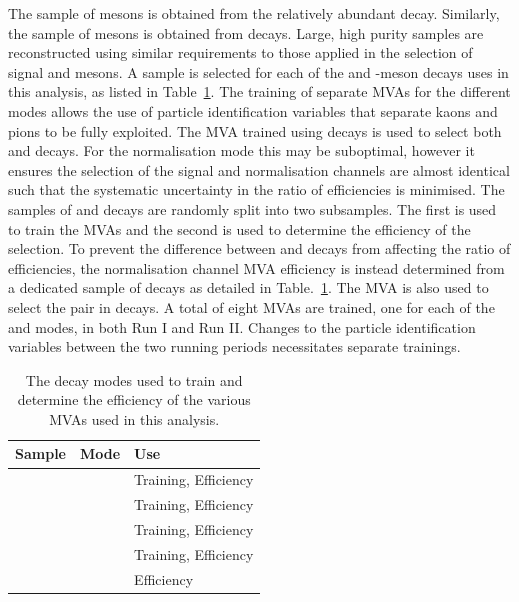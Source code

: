 The sample of \Dsp mesons is obtained from the relatively abundant \decay{\Bsb}{\Dsp\pim} decay. Similarly, the sample of \phiz mesons is obtained from \decay{\Bs}{\jpsi\phiz} decays. Large, high purity samples are reconstructed using similar requirements to those applied in the selection of signal \Dsp and \phiz mesons.
A sample is selected for each of the \Dsp and \phiz-meson decays uses in this analysis, as listed in Table~\ref{tab:mva_modes}. 
The training of separate MVAs for the different \Dsp modes allows the use of particle identification variables that separate kaons and pions to be fully exploited.
The MVA trained using \decay{\Bs}{\jpsi(\decay{\phiz}{\Kp\Km})} decays is used to select both \decay{\phiz}{\Kp}{\Km} and \decay{\Dzb}{\Kp\Km} decays. For the normalisation mode this may be suboptimal, however it ensures the selection of the signal and normalisation channels are almost identical such that the systematic uncertainty in the ratio of efficiencies is minimised.
The samples of \decay{\Bsb}{\Dsp\pim} and \decay{\Bs}{\jpsi\phiz} decays are randomly split into two subsamples. The first is used to train the MVAs and the second is used to determine the efficiency of the selection. To prevent the difference between \phiz and \Dzb decays from affecting the ratio of efficiencies, the normalisation channel MVA efficiency is instead determined from a dedicated sample of \decay{\Dzb}{\Kp\Km} decays as detailed in Table.~\ref{tab:mva_modes}. The \decay{\phiz}{\Kp\Km} MVA is also used to select the \Kp\Km pair in \decay{\Bp}{\Dsp\Kp\Km} decays.
A total of eight MVAs are trained, one for each of the \Dsp and \phiz modes, in both Run I and Run II. Changes to the particle identification variables between the two running periods necessitates separate trainings. 


\begin{table}[h]
\centering
\begin{tabular}{lll}
   \hline
   Sample                    & Mode                       & Use \\ 
   \hline
   \decay{\Bsb}{\Dsp\pim}    & \decay{\Dsp}{\Kp\Km\pip}   & Training, Efficiency \\
   \decay{\Bsb}{\Dsp\pim}    & \decay{\Dsp}{\Kp\pim\pip}  & Training, Efficiency \\
   \decay{\Bsb}{\Dsp\pim}    & \decay{\Dsp}{\pip\pim\pip} & Training, Efficiency \\
   \decay{\Bs}{\jpsi\phiz}   & \decay{\phiz}{\Kp\Km}      & Training, Efficiency \\
   \hline
   \decay{\Bp}{\Dzb\pip}     & \decay{\Dzb}{\Kp\Km}       & Efficiency          \\
   \hline
\end{tabular}

\caption{The decay modes used to train and determine the efficiency of the various MVAs used in this analysis.}
\label{tab:mva_modes}
\end{table}

